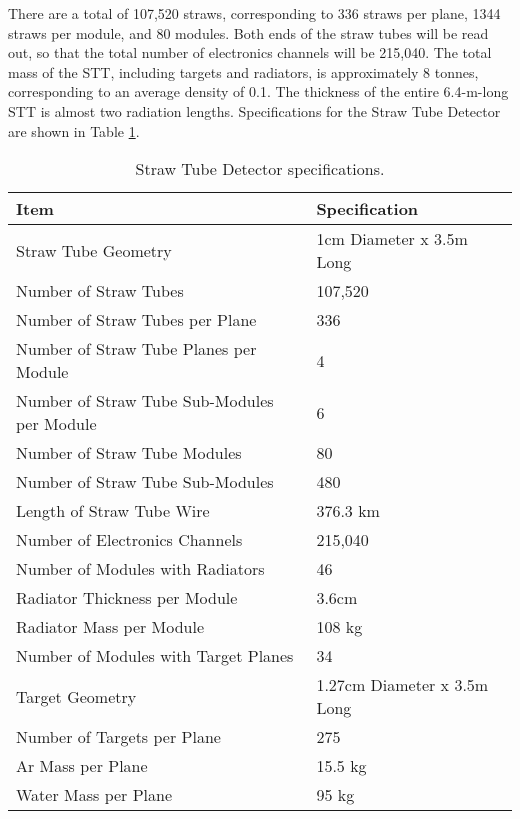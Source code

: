 There are a total of 107,520 straws, corresponding to 336 straws per plane,
1344 straws per module,
and 80 modules. Both ends of the straw tubes will be read out, so that the total
number of electronics channels will be 215,040. 
The total mass of the STT, including targets and radiators, is approximately 8 
tonnes, corresponding to an average density of 0.1. 
The thickness of the entire 6.4-m-long STT is almost two 
radiation lengths. Specifications for the Straw Tube Detector are shown in Table \ref{STT_details}.


\begin{table}
\centering
  \caption{\label{STT_details} Straw Tube Detector specifications.}
  \begin{tabular}{| l | l |}
    \hline
Item&Specification \\
    \hline
Straw Tube Geometry & 1cm Diameter x 3.5m Long \\
Number of Straw Tubes & 107,520 \\
Number of Straw Tubes per Plane & 336 \\
Number of Straw Tube Planes per Module & 4 \\
Number of Straw Tube Sub-Modules per Module & 6 \\
Number of Straw Tube Modules & 80 \\
Number of Straw Tube Sub-Modules & 480 \\
Length of Straw Tube Wire & 376.3 km \\
Number of Electronics Channels & 215,040 \\
Number of Modules with Radiators & 46 \\
Radiator Thickness per Module & 3.6cm \\
Radiator Mass per Module & 108 kg \\
Number of Modules with Target Planes & 34 \\
Target Geometry & 1.27cm Diameter x 3.5m Long \\
Number of Targets per Plane & 275 \\
Ar Mass per Plane & 15.5 kg \\
Water Mass per Plane & 95 kg \\
     \hline
  \end{tabular}
\end{table}

